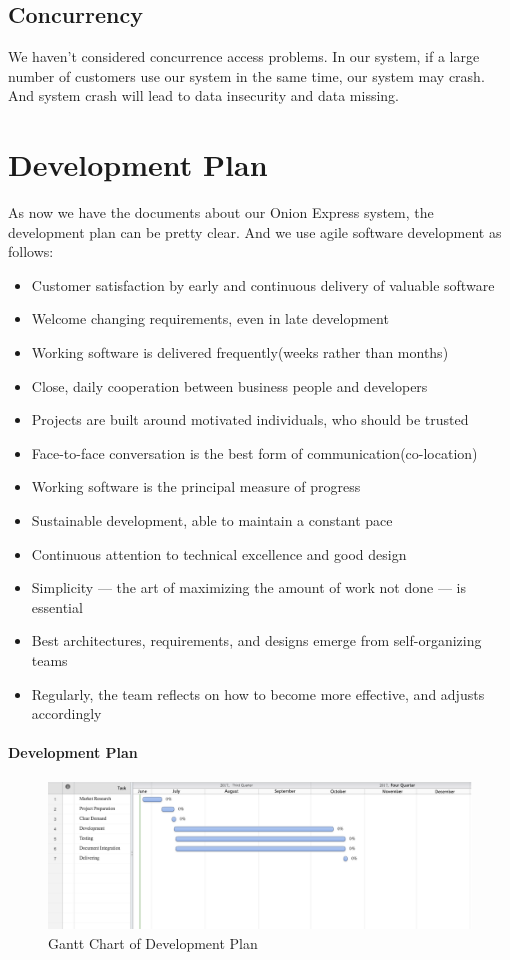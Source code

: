\documentclass[12pt]{scrreprt}
\begin{document}
\section{Concurrency}
We haven't considered concurrence access problems. In our system, if a large number of customers use our system in the same time, our system may  crash.  And system crash will lead to data insecurity and data missing.
\chapter{Development Plan}
As now we have the documents about our Onion Express system, the development plan can be pretty clear. And we use agile software development as follows:
\begin{itemize}
	\item Customer satisfaction by early and continuous delivery of valuable software
	\item Welcome changing requirements, even in late development
	\item Working software is delivered frequently(weeks rather than months)
	\item Close, daily cooperation between business people and developers
	\item Projects are built around motivated individuals, who should be trusted
	\item Face-to-face conversation is the best form of communication(co-location)
	\item Working software is the principal measure of progress
	\item Sustainable development, able to maintain a constant pace
	\item Continuous attention to technical excellence and good design
	\item Simplicity — the art of maximizing the amount of work not done — is essential
	\item Best architectures, requirements, and designs emerge from self-organizing teams
	\item Regularly, the team reflects on how to become more effective, and adjusts accordingly
\end{itemize}
\subsubsection{Development Plan}
\begin{figure}[H]
	\centering\includegraphics[width=6in]{DocumentRes/DevelopmentPlan.png}
	\caption{Gantt Chart of Development Plan}
\end{figure}
\end{document}
